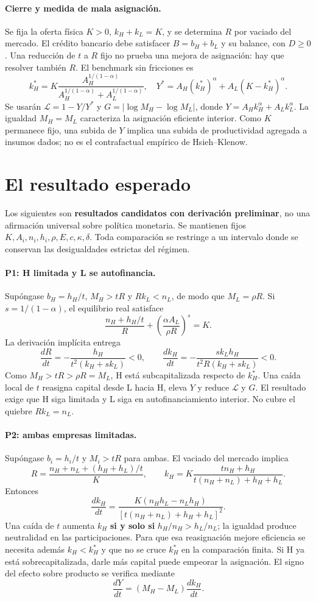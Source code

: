 \documentclass[11pt]{article}
\begin{document}
\paragraph{Cierre y medida de mala asignaci\'on.}
Se fija la oferta f\'isica $K>0$, $k_H+k_L=K$, y se determina $R$ por vaciado
del mercado. El cr\'edito bancario debe satisfacer $B=b_H+b_L$ y su balance,
con $D\geq0$. Una reducci\'on de $t$ a $R$ fijo no prueba una mejora de
asignaci\'on: hay que resolver tambi\'en $R$. El benchmark sin fricciones es
\[
 k_H^*=K\frac{A_H^{1/(1-\alpha)}}{A_H^{1/(1-\alpha)}+A_L^{1/(1-\alpha)}},
 \quad Y^*=A_H(k_H^*)^\alpha+A_L(K-k_H^*)^\alpha.
\]
Se usar\'an $\mathcal L=1-Y/Y^*$ y
$G=|\log M_H-\log M_L|$, donde $Y=A_Hk_H^\alpha+A_Lk_L^\alpha$.
La igualdad $M_H=M_L$ caracteriza la asignaci\'on eficiente interior. Como
$K$ permanece fijo, una subida de $Y$ implica una subida de productividad
agregada a insumos dados; no es el contrafactual emp\'irico de Hsieh--Klenow.

\newpage
\section{El resultado esperado}
Los siguientes son \textbf{resultados candidatos con derivaci\'on preliminar},
no una afirmaci\'on universal sobre pol\'itica monetaria. Se mantienen fijos
$K,A_i,n_i,h_i,\rho,E,c,\kappa,\delta$. Toda comparaci\'on se restringe a un
intervalo donde se conservan las desigualdades estrictas del r\'egimen.

\paragraph{P1: H limitada y L se autofinancia.}
Sup\'ongase $b_H=h_H/t$, $M_H>tR$ y $Rk_L<n_L$, de modo que
$M_L=\rho R$. Si $s=1/(1-\alpha)$, el equilibrio real satisface
\[
 \frac{n_H+h_H/t}{R}+\left(\frac{\alpha A_L}{\rho R}\right)^s=K.
\]
La derivaci\'on impl\'icita entrega
\[
 \frac{dR}{dt}=-\frac{h_H}{t^2(k_H+sk_L)}<0,\qquad
 \frac{dk_H}{dt}=-\frac{sk_Lh_H}{t^2R(k_H+sk_L)}<0.
\]
Como $M_H>tR>\rho R=M_L$, H est\'a subcapitalizada respecto de $k_H^*$.
Una ca\'ida local de $t$ reasigna capital desde L hacia H, eleva $Y$ y reduce
$\mathcal L$ y $G$. El resultado exige que H siga limitada y L siga en
autofinanciamiento interior. No cubre el quiebre $Rk_L=n_L$.

\paragraph{P2: ambas empresas limitadas.}
Sup\'ongase $b_i=h_i/t$ y $M_i>tR$ para ambas. El vaciado del mercado implica
\[
 R=\frac{n_H+n_L+(h_H+h_L)/t}{K},\qquad
 k_H=K\frac{tn_H+h_H}{t(n_H+n_L)+h_H+h_L}.
\]
Entonces
\[
 \frac{dk_H}{dt}
 =\frac{K(n_Hh_L-n_Lh_H)}{[t(n_H+n_L)+h_H+h_L]^2}.
\]
Una ca\'ida de $t$ aumenta $k_H$ \textbf{si y solo si}
$h_H/n_H>h_L/n_L$; la igualdad produce neutralidad en las participaciones.
Para que esa reasignaci\'on mejore eficiencia se necesita adem\'as
$k_H<k_H^*$ y que no se cruce $k_H^*$ en la comparaci\'on finita. Si H ya
est\'a sobrecapitalizada, darle m\'as capital puede empeorar la asignaci\'on.
El signo del efecto sobre producto se verifica mediante
\[
 \frac{dY}{dt}=(M_H-M_L)\frac{dk_H}{dt}.
\]
\end{document}
